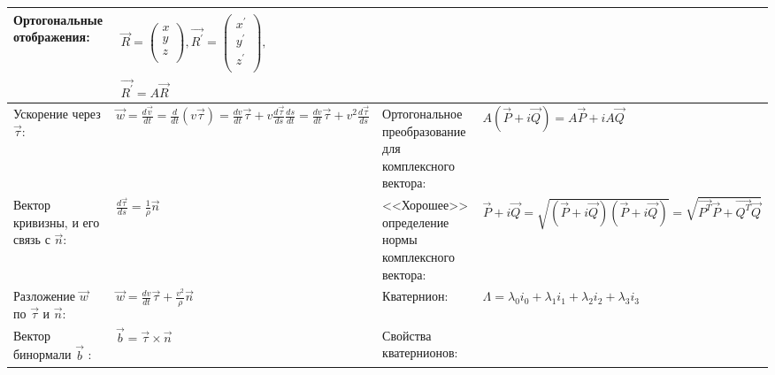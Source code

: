 \documentclass{article}
\begin{document}
\begin{tabular}{ |p{3.8cm}|p{5.7cm}|p{3.8cm}|p{5.7cm}|  }
Ортогональные отображения:                                                   &  %
$\begin{aligned}
\vec{R} =
\left(\begin{array}{c}
x \\
y \\
z \\
\end{array} \right),
\vec{R^{'}} =
\left(\begin{array}{c}
x^{'} \\
y^{'} \\
z^{'} \\
\end{array} \right),         \\
\vec{R^{'}} = A \vec{R}
\end{aligned}$                                                               \\ %
\hline
Ускорение через $\vec{\tau}$:                                                &  %
$\vec{w} = \frac{d\vec{v}}{dt} =
\frac{d}{dt} (v \vec{\tau}) =
\frac{dv}{dt} \vec{\tau} + v \frac{d\vec{\tau}}{ds} \frac{ds}{dt} =
\frac{dv}{dt} \vec{\tau} + v^2 \frac{d \vec{\tau}}{ds}$                      &  %
Ортогональное преобразование для комплексного вектора:                       &  %
$A (\vec{P} + i \vec{Q}) = A \vec{P} + i A \vec{Q}$                          \\ %
\hline
Вектор кривизны, и его связь с $\vec{n}$:                                    &  %
$\frac{d\vec{\tau}}{ds} = \frac{1}{\rho} \vec{n}$                            &  %
<<Хорошее>> определение нормы комплексного вектора:                          &  %
$\vec{P} + i \vec{Q} = \sqrt{(\vec{P} + i \vec{Q})(\vec{P} + i \vec{Q})} =
\sqrt{\vec{P^T}\vec{P} + \vec{Q^T}\vec{Q}}$                                  \\ %
\hline
Разложение $\vec{w}$ по $\vec{\tau}$ и $\vec{n}$:                            &  %
$\vec{w} = \frac{dv}{dt} \vec{\tau} + \frac{v^2}{\rho} \vec{n}$              &  %
Кватернион:                                                                  &  %
$\Lambda = \lambda_0 i_0 + \lambda_1 i_1 + \lambda_2 i_2 + \lambda_3 i_3$    \\ %
\hline
Вектор бинормали $\vec{b}$ :                                                 &  %
$\vec{b} = \vec{\tau} \times \vec{n}$                                        &  %
Свойства кватернионов:                                                       &  %

\end{tabular}
\end{document}
